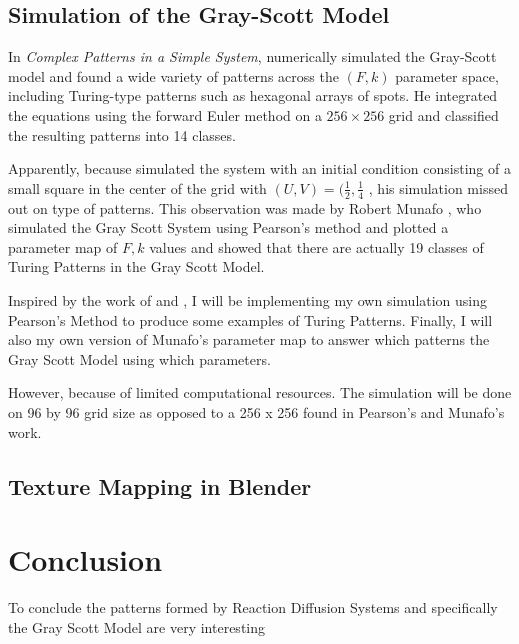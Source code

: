 \documentclass[a4paper, 11pt]{article}
\begin{document}
\subsection{Simulation of the Gray-Scott Model} 

In \textit{Complex Patterns in a Simple System}, \textcite{pearson1993} numerically simulated the Gray-Scott model and found a wide variety of patterns across the
$(F, k)$ parameter space, including Turing-type patterns such as hexagonal arrays of
spots. He integrated the equations using the forward Euler method on a
$256 \times 256$ grid and classified the resulting patterns into 14 classes. 

Apparently, because \textcite{pearson1993} simulated the system with an initial condition consisting of a small square in the center of the grid with $(U, V) = (\frac{1}{2}, \frac{1}{4}$ , his simulation missed out on type of patterns. This observation was made by Robert Munafo \parencite{munafo2022pearson}, who simulated the Gray Scott System using Pearson's method and plotted a parameter map of $F, k$ values and showed that there are actually 19 classes of Turing Patterns in the Gray Scott Model.  

Inspired by the work of \textcite{pearson1993} and \textcite{munafo2022pearson}, I will be implementing my own simulation using Pearson's Method to produce some examples of Turing Patterns. Finally, I will also my own version of Munafo's parameter map to answer which patterns the Gray Scott Model using which parameters. 

However, because of limited computational resources. The simulation will be done on 96 by 96 grid size as opposed to a 256 x 256 found in Pearson's and Munafo's work. 

\label{sec:parameter-map}
\label{sec:numerical}
\subsection{Texture Mapping in Blender}



\section{Conclusion}
\label{sec:conclusion}
To conclude the patterns formed by Reaction Diffusion Systems and specifically the Gray Scott Model are very interesting
\end{document}
